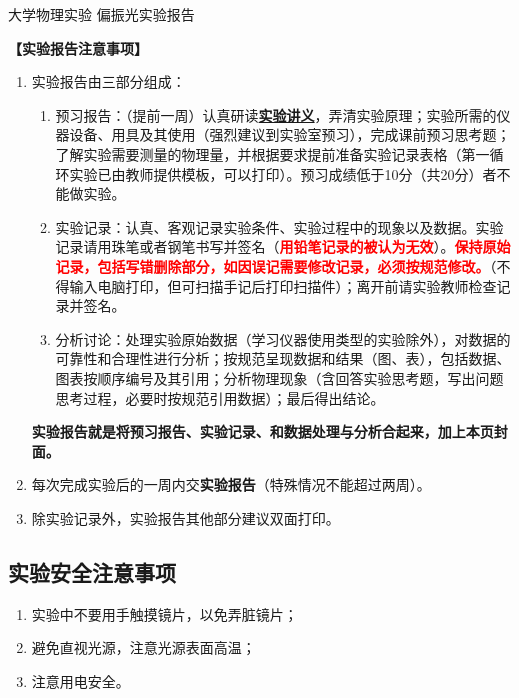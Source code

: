 \documentclass[dvipsnames, svgnames,a4paper,11pt]{article}
\begin{document}

\infoTable{\rule{2.5cm}{0.4pt}}{\rule{2.5cm}{0.4pt}}{\rule{2.5cm}{0.4pt}}{\rule{3cm}{0.4pt}}{\rule{3cm}{0.4pt}}{\rule{3cm}{0.4pt}}

\begin{center}
	\LARGE 大学物理实验 \quad 偏振光实验报告
\end{center}

\textbf{【实验报告注意事项】}
\begin{enumerate}
	\item 实验报告由三部分组成：
	\begin{enumerate}
		\item 预习报告：（提前一周）认真研读\underline{\textbf{实验讲义}}，弄清实验原理；实验所需的仪器设备、用具及其使用（强烈建议到实验室预习），完成课前预习思考题；了解实验需要测量的物理量，并根据要求提前准备实验记录表格（第一循环实验已由教师提供模板，可以打印）。预习成绩低于10分（共20分）者不能做实验。
	    \item 实验记录：认真、客观记录实验条件、实验过程中的现象以及数据。实验记录请用珠笔或者钢笔书写并签名（\textcolor{red}{\textbf{用铅笔记录的被认为无效}}）。\textcolor{red}{\textbf{保持原始记录，包括写错删除部分，如因误记需要修改记录，必须按规范修改。}}（不得输入电脑打印，但可扫描手记后打印扫描件）；离开前请实验教师检查记录并签名。
	    \item 分析讨论：处理实验原始数据（学习仪器使用类型的实验除外），对数据的可靠性和合理性进行分析；按规范呈现数据和结果（图、表），包括数据、图表按顺序编号及其引用；分析物理现象（含回答实验思考题，写出问题思考过程，必要时按规范引用数据）；最后得出结论。
	\end{enumerate}
	\textbf{实验报告就是将预习报告、实验记录、和数据处理与分析合起来，加上本页封面。}
	\item 每次完成实验后的一周内交\textbf{实验报告}（特殊情况不能超过两周）。
	\item 除实验记录外，实验报告其他部分建议双面打印。
\end{enumerate}

\subsection{实验安全注意事项}
\begin{enumerate}
	\item 实验中不要用手触摸镜片，以免弄脏镜片；
	\item 避免直视光源，注意光源表面高温；
	\item 注意用电安全。
\end{enumerate}
\clearpage
\end{document}
